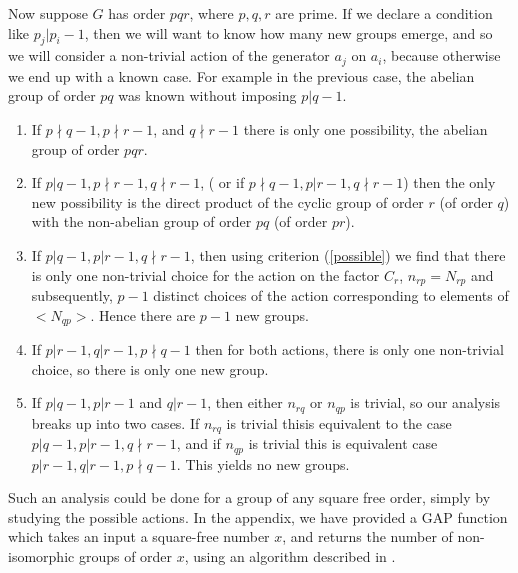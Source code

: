 \documentclass[11pt]{book}
\theoremstyle{Rem}
\theoremstyle{definition}
\numberwithin{equation}{section}
\begin{document}
Now suppose $G$ has order $pqr$, where $p, q, r$ are prime. If we declare a condition like $p_j|p_i-1$, then we will want to know how many new groups emerge, and so we will consider a non-trivial action of the generator $a_j$ on $a_i$, because otherwise we end up with a known case. For example in the previous case, the abelian group of order $pq$ was known without imposing $p|q-1$.\\
\begin{enumerate}
	\item If $p\nmid q-1, p\nmid r-1$, and $q\nmid r-1$ there is only one possibility, the abelian group of order $pqr$. 
	\item If $p|q-1, p\nmid r-1, q\nmid r-1$, ( or if $p\nmid q-1, p| r-1, q\nmid r-1$) then the only new possibility is the direct product of the cyclic group of order $r$ (of order $q$) with the non-abelian group of order $pq$ (of order $pr$). 
	\item If $p|q-1,p|r-1, q\nmid r-1$, then using criterion (\ref{possible}) we find that there is only one non-trivial choice for the action on the factor $C_r$, $n_{rp} = N_{rp}$ and subsequently, $p-1$ distinct choices of the action corresponding to elements of $<N_{qp}>$. Hence there are $p-1$ new groups.	
\item If $p|r-1, q|r-1, p\nmid q-1$ then for both actions, there is only one non-trivial choice, so there is only one new group.
\item If $p|q-1, p|r-1$ and $q|r-1$, then either $n_{rq}$ or $n_{qp}$ is trivial, so our analysis breaks up into two cases. If $n_{rq}$ is trivial thisis equivalent to the case $p|q-1, p|r-1, q\nmid r-1$, and if $n_{qp}$ is trivial this is equivalent case $p|r-1, q|r-1, p\nmid q-1$. This yields no new groups.\\
\end{enumerate}
Such an analysis could be done for a group of any square free order, simply by studying the possible actions. In the appendix, we have provided a GAP function which takes an input a square-free number $x$, and returns the number of non-isomorphic groups of order $x$, using an algorithm described in \cite{MR506898}. 
\end{document}

